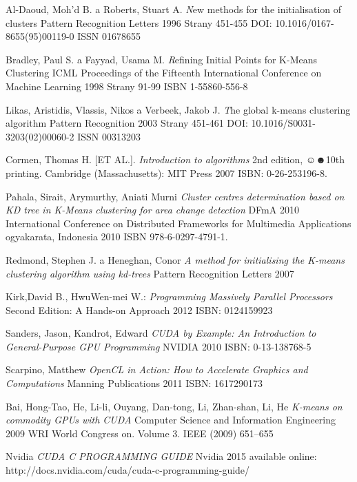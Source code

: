 \begin{thebibliography}{99}
{\sc Al-Daoud}, Moh'd B. a {\sc Roberts}, Stuart A.
{\emph New methods for the initialisation of clusters}
Pattern Recognition Letters
1996
Strany 451-455
DOI: 10.1016/0167-8655(95)00119-0
ISSN 01678655

{\sc Bradley}, Paul S. a {\sc Fayyad}, Usama M.
{\emph Refining Initial Points for K-Means Clustering}
ICML Proceedings of the Fifteenth International Conference on Machine Learning
1998
Strany 91-99
ISBN 1-55860-556-8

{\sc Likas}, Aristidis, {\sc Vlassis}, Nikos a {\sc Verbeek}, Jakob J.
{\emph The global k-means clustering algorithm}
Pattern Recognition
2003
Strany 451-461
DOI: 10.1016/S0031-3203(02)00060-2
ISSN 00313203

{\sc Cormen,} Thomas H. [ET AL.].
\emph{Introduction to algorithms}
2nd edition, ☺☻10th printing.
Cambridge (Massachusetts): MIT Press
2007 
ISBN: 0-26-253196-8.

{\sc Pahala,} Sirait, {\sc Arymurthy,} Aniati Murni
\emph{Cluster centres determination based on KD tree in K-Means clustering for area change detection}
DFmA 2010 International Conference on Distributed Frameworks for Multimedia Applications
ogyakarata, Indonesia
2010 
ISBN 978-6-0297-4791-1.

{\sc Redmond}, Stephen J. a {\sc Heneghan}, Conor
\emph{A method for initialising the K-means clustering algorithm using kd-trees}
Pattern Recognition Letters
2007

{\sc Kirk,}David B., {\sc Hwu}Wen-mei W.:
\emph{Programming Massively Parallel Processors}
Second Edition: A Hands-on Approach
2012
ISBN: 0124159923 

{\sc Sanders,} Jason, {\sc Kandrot,} Edward
\emph{CUDA by Example: An Introduction to General-Purpose GPU Programming}
NVIDIA
2010
ISBN: 0-13-138768-5 

{\sc Scarpino,} Matthew
\emph{OpenCL in Action: How to Accelerate Graphics and Computations}
Manning Publications
2011
ISBN: 1617290173 

{\sc Bai,} Hong-Tao, {\sc He,} Li-li, {\sc Ouyang,} Dan-tong, {\sc Li,} Zhan-shan, {\sc Li, } He
\emph{K-means on commodity GPUs with CUDA}
Computer Science and Information Engineering
2009
WRI World Congress on. Volume 3.
IEEE (2009) 651–655 

Nvidia
\emph{CUDA C PROGRAMMING GUIDE}
Nvidia
2015
available online: http://docs.nvidia.com/cuda/cuda-c-programming-guide/
\end{thebibliography}